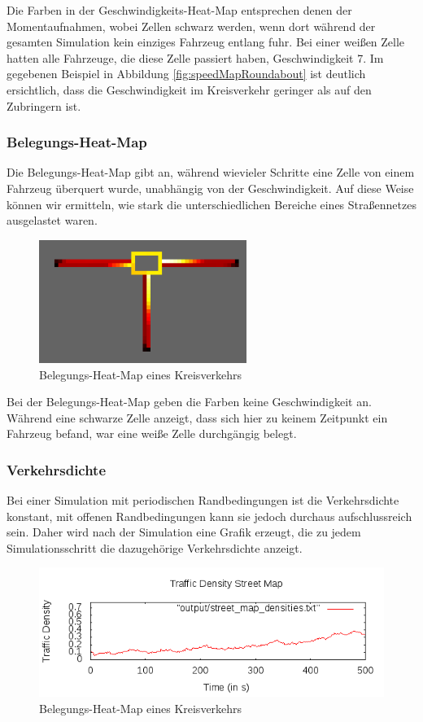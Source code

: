 \documentclass[10pt, a4paper]{article}
\begin{document}
Die Farben in der Geschwindigkeits-Heat-Map entsprechen denen der Momentaufnahmen, wobei Zellen schwarz werden, wenn dort während der gesamten Simulation kein einziges Fahrzeug entlang fuhr. Bei einer weißen Zelle hatten alle Fahrzeuge, die diese Zelle passiert haben, Geschwindigkeit 7. Im gegebenen Beispiel in Abbildung \ref{fig:speedMapRoundabout} ist deutlich ersichtlich, dass die Geschwindigkeit im Kreisverkehr geringer als auf den Zubringern ist.

\subsubsection{Belegungs-Heat-Map}
\label{subsubsec:occupancymap}
Die Belegungs-Heat-Map gibt an, während wievieler Schritte eine Zelle von einem Fahrzeug überquert wurde, unabhängig von der Geschwindigkeit. Auf diese Weise können wir ermitteln, wie stark die unterschiedlichen Bereiche eines Straßennetzes ausgelastet waren.

\begin{figure}[h!]
	\centering
	\includegraphics[height=4cm]{img/vis_roundabout_occupancy_heat_map}
	\caption{Belegungs-Heat-Map eines Kreisverkehrs}
	\label{fig:occupancyMapRoundabout}
\end{figure}
Bei der Belegungs-Heat-Map geben die Farben keine Geschwindigkeit an. Während eine schwarze Zelle anzeigt, dass sich hier zu keinem Zeitpunkt ein Fahrzeug befand, war eine weiße Zelle durchgängig belegt.

\subsubsection{Verkehrsdichte}
\label{subsubsec:verkehrsdichte}

Bei einer Simulation mit periodischen Randbedingungen ist die Verkehrsdichte konstant, mit offenen Randbedingungen kann sie jedoch durchaus aufschlussreich sein. Daher wird nach der Simulation eine Grafik erzeugt, die zu jedem Simulationsschritt die dazugehörige Verkehrsdichte anzeigt.
\begin{figure}[h!]
	\centering
	\includegraphics[width=\textwidth]{img/vis_street_map_densities}
	\caption{Belegungs-Heat-Map eines Kreisverkehrs}
	\label{fig:occupancyMapRoundabout}
\end{figure}
\end{document}
